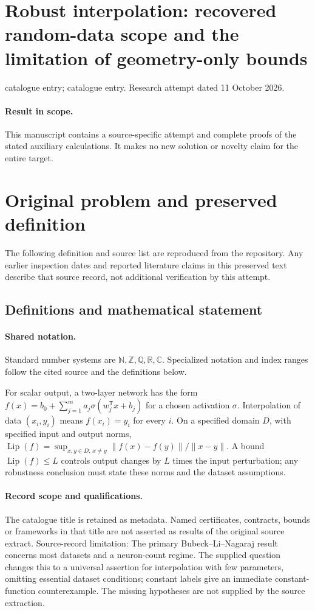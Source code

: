 \documentclass[11pt]{article}
\begin{document}
\section*{Robust interpolation: recovered random-data scope and the limitation of geometry-only bounds}
\noindent catalogue entry; catalogue entry. Research attempt dated 11 October 2026.
\paragraph{Result in scope.}This manuscript contains a source-specific attempt and complete proofs of the stated auxiliary calculations. It makes no new solution or novelty claim for the entire target.
\section{Original problem and preserved definition}
The following definition and source list are reproduced from the repository. Any earlier inspection dates and reported literature claims in this preserved text describe that source record, not additional verification by this attempt.
\subsection{Definitions and mathematical statement}

\paragraph{Shared notation.}Standard number systems are $\mathbb N,\mathbb Z,\mathbb Q,\mathbb R,\mathbb C$. Specialized notation and index ranges follow the cited source and the definitions below.


For scalar output, a two-layer network has the form $f(x)=b_0+\sum_{j=1}^m a_j\sigma(w_j^{\mathsf T}x+b_j)$ for a chosen activation $\sigma$. Interpolation of data $(x_i,y_i)$ means $f(x_i)=y_i$ for every $i$. On a specified domain $D$, with specified input and output norms, $\operatorname{Lip}(f)=\sup_{x,y\in D,\,x\ne y}\|f(x)-f(y)\|/\|x-y\|$. A bound $\operatorname{Lip}(f)\le L$ controls output changes by $L$ times the input perturbation; any robustness conclusion must state these norms and the dataset assumptions.
\paragraph{Record scope and qualifications.}
The catalogue title is retained as metadata. Named certificates, contracts, bounds or frameworks in that title are not asserted as results of the original source extract.
Source-record limitation: The primary Bubeck--Li--Nagaraj result concerns most datasets and a neuron-count regime. The supplied question changes this to a universal assertion for interpolation with few parameters, omitting essential dataset conditions; constant labels give an immediate constant-function counterexample. The missing hypotheses are not supplied by the source extraction.
\end{document}
